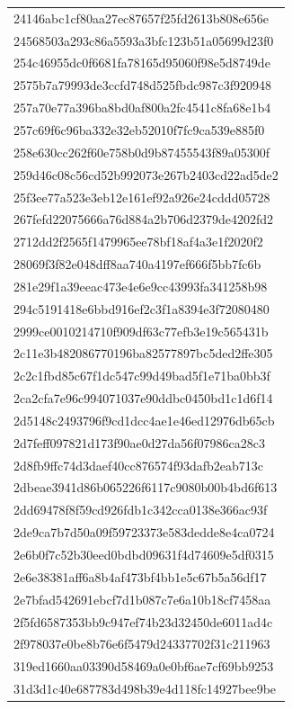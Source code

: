 \begin{tabular}{l}
24146abc1cf80aa27ec87657f25fd2613b808e656e \\
24568503a293c86a5593a3bfc123b51a05699d23f0 \\
254c46955dc0f6681fa78165d95060f98e5d8749de \\
2575b7a79993de3ccfd748d525fbdc987c3f920948 \\
257a70e77a396ba8bd0af800a2fc4541c8fa68e1b4 \\
257c69f6c96ba332e32eb52010f7fc9ca539e885f0 \\
258e630cc262f60e758b0d9b87455543f89a05300f \\
259d46c08c56cd52b992073e267b2403cd22ad5de2 \\
25f3ee77a523e3eb12e161ef92a926e24cddd05728 \\
267fefd22075666a76d884a2b706d2379de4202fd2 \\
2712dd2f2565f1479965ee78bf18af4a3e1f2020f2 \\
28069f3f82e048dff8aa740a4197ef666f5bb7fc6b \\
281e29f1a39eeac473e4e6e9cc43993fa341258b98 \\
294c5191418e6bbd916ef2c3f1a8394e3f72080480 \\
2999ce0010214710f909df63c77efb3e19c565431b \\
2c11e3b482086770196ba82577897bc5ded2ffe305 \\
2c2c1fbd85c67f1dc547c99d49bad5f1e71ba0bb3f \\
2ca2cfa7e96c994071037e90ddbc0450bd1c1d6f14 \\
2d5148c2493796f9cd1dcc4ae1e46ed12976db65cb \\
2d7feff097821d173f90ae0d27da56f07986ca28c3 \\
2d8fb9ffc74d3daef40cc876574f93dafb2eab713c \\
2dbeae3941d86b065226f6117c9080b00b4bd6f613 \\
2dd69478f8f59cd926fdb1c342cca0138e366ac93f \\
2de9ca7b7d50a09f59723373e583dedde8e4ca0724 \\
2e6b0f7c52b30eed0bdbd09631f4d74609e5df0315 \\
2e6e38381aff6a8b4af473bf4bb1e5c67b5a56df17 \\
2e7bfad542691ebcf7d1b087c7e6a10b18cf7458aa \\
2f5fd6587353bb9c947ef74b23d32450de6011ad4c \\
2f978037e0be8b76e6f5479d24337702f31c211963 \\
319ed1660aa03390d58469a0e0bf6ae7cf69bb9253 \\
31d3d1c40e687783d498b39e4d118fc14927bee9be \\

\end{tabular}

